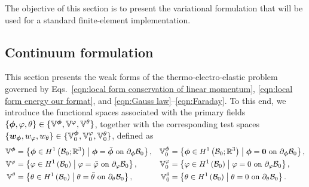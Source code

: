 The objective of this section is to present the variational formulation that will be used for a standard finite-element implementation. 

\subsection{Continuum formulation}
%
%

This section presents the weak forms of the thermo-electro-elastic problem governed by Eqs.~\eqref{eqn:local form conservation of linear momentum}, \eqref{eqn:local form energy our format}, and \eqref{eqn:Gauss law}--\eqref{eqn:Faraday}. 
To this end, we introduce the functional spaces associated with the primary fields 
$\{\boldsymbol{\phi}, \varphi, \theta\} \in \{\mathbb{V}^{\boldsymbol{\phi}}, \mathbb{V}^{\varphi}, \mathbb{V}^{\theta}\}$, 
together with the corresponding test spaces 
$\{\boldsymbol{w}_{\boldsymbol{\phi}}, w_{\varphi}, w_{\theta}\} \in \{\mathbb{V}_0^{\boldsymbol{\phi}}, \mathbb{V}_0^{\varphi}, \mathbb{V}_0^{\theta}\}$, defined as
%
\begin{equation}\label{eqn:functional spaces}
	\begin{aligned}
		\mathbb{V}^{\boldsymbol{\phi}} &=
		\left\{
		\boldsymbol{\phi}\in H^1\left(\mathcal{B}_0;\mathbb{R}^3\right)\; \middle|\;
		\boldsymbol{\phi} = \bar{\boldsymbol{\phi}} \ \text{on}\ \partial_{\boldsymbol{\phi}}\mathcal{B}_0
		\right\},
		&
		\mathbb{V}_0^{\boldsymbol{\phi}} &=
		\left\{
		\boldsymbol{\phi}\in H^1\left(\mathcal{B}_0;\mathbb{R}^3\right)\; \middle|\;
		\boldsymbol{\phi} = \boldsymbol{0} \ \text{on}\ \partial_{\boldsymbol{\phi}}\mathcal{B}_0
		\right\},
		\\
		\mathbb{V}^{\varphi} &=
		\left\{
		\varphi \in H^1\left(\mathcal{B}_0\right)\; \middle|\;
		\varphi = \bar{\varphi} \ \text{on}\ \partial_{\varphi}\mathcal{B}_0
		\right\},
		&
		\mathbb{V}_0^{\varphi} &=
		\left\{
		\varphi \in H^1\left(\mathcal{B}_0\right)\; \middle|\;
		\varphi = 0 \ \text{on}\ \partial_{\varphi}\mathcal{B}_0
		\right\},
		\\
		\mathbb{V}^{\theta} &=
		\left\{
		\theta \in H^1\left(\mathcal{B}_0\right)\; \middle|\;
		\theta = \bar{\theta} \ \text{on}\ \partial_{\theta}\mathcal{B}_0
		\right\},
		&
		\mathbb{V}_0^{\theta} &=
		\left\{
		\theta \in H^1\left(\mathcal{B}_0\right)\; \middle|\;
		\theta = 0 \ \text{on}\ \partial_{\theta}\mathcal{B}_0
		\right\}.
	\end{aligned}
\end{equation}

